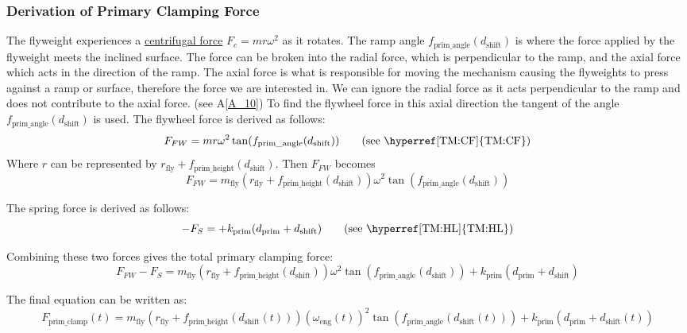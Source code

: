 \documentclass[12pt]{article}
\newcommand{\aref}[1]{A\ref{#1}}
\begin{document}
\subsubsection*{Derivation of Primary Clamping Force}

The flyweight experiences a \hyperref[TM:CF]{centrifugal force} {$F_c = m r\omega^2 $} as it rotates. 
The ramp angle $f_{\text{prim\_angle}}(d_{\text{shift}})$ is where the force applied by the flyweight meets the inclined surface.
The force can be broken into the radial force, which is perpendicular to the ramp, and the axial force which acts in the direction of the ramp.
The axial force is what is responsible for moving the mechanism causing the flyweights to press against a ramp or surface, therefore the force we are interested in.
We can ignore the radial force as it acts perpendicular to the ramp and does not contribute to the axial force. (see \aref{A_10})
To find the flywheel force in this axial direction the tangent of the angle $f_{\text{prim\_angle}}(d_{\text{shift}})$ is used.
The flywheel force is derived as follows: 
\[
F_{FW} = m r \omega^2 \tan(f_{\text{prim\_angle}}(d_{\text{shift}})) \tag*{\text{(see \hyperref[TM:CF]{TM:CF})}}
\]
Where \( r \) can be represented by \( r_{\text{fly}} + f_{\text{prim\_height}}(d_{\text{shift}}) \). Then \( F_{FW} \) becomes 
\[
F_{FW} = m_\text{fly} (r_{\text{fly}} + f_{\text{prim\_height}}(d_{\text{shift}}))\omega^2 \tan(f_{\text{prim\_angle}}(d_{\text{shift}}))
\]

The spring force is derived as follows: 
\[
-F_S = + k_{\text{prim}} (d_{\text{prim}} + d_{\text{shift}}) \tag*{\text{(see \hyperref[TM:HL]{TM:HL})}}
\]

Combining these two forces gives the total primary clamping force:
\[
F_{FW} - F_S =  m_\text{fly} (r_{\text{fly}} + f_{\text{prim\_height}}(d_{\text{shift}}))\omega^2 \tan(f_{\text{prim\_angle}}(d_{\text{shift}})) + k_{\text{prim}} (d_{\text{prim}} + d_{\text{shift}})
\]

The final equation can be written as:
\[
F_{\text{prim\_clamp}}(t) = m_\text{fly} (r_{\text{fly}} + f_{\text{prim\_height}}({d_\text{shift}(t)}))(\omega_\text{eng}(t))^2 \tan(f_{\text{prim\_angle}}(d_\text{shift}(t))) + k_{\text{prim}} (d_{\text{prim}} + d_\text{shift}(t))
\]
\end{document}
